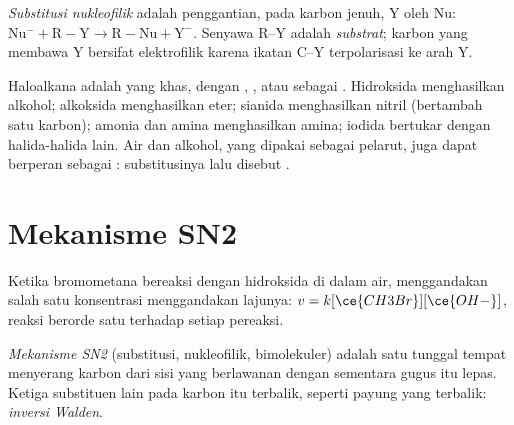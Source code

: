 \begin{definition}\label{def:b1:nucleophilic-substitution:substitution}
\emph{Substitusi nukleofilik} adalah
penggantian, pada karbon jenuh,  Y oleh  Nu:
$\mathrm{Nu^-} + \mathrm{R{-}Y} \to \mathrm{R{-}Nu} +
\mathrm{Y^-}$. Senyawa R--Y adalah \emph{substrat};
karbon yang membawa Y bersifat elektrofilik karena ikatan C--Y
terpolarisasi ke arah Y.
\end{definition}

Haloalkana adalah  yang khas, dengan , , atau
 sebagai . Hidroksida menghasilkan alkohol; alkoksida
menghasilkan eter; sianida menghasilkan nitril (bertambah satu karbon);
amonia dan amina menghasilkan amina; iodida bertukar dengan halida-halida
lain. Air dan alkohol, yang dipakai sebagai pelarut, juga dapat berperan
sebagai : substitusinya lalu disebut .

\section{Mekanisme SN2}

Ketika bromometana bereaksi dengan hidroksida di dalam air, menggandakan
salah satu konsentrasi menggandakan lajunya: $v = k[\ce{CH3Br}][\ce{OH-}]$,
reaksi berorde satu terhadap setiap pereaksi.

\begin{definition}\label{def:b1:nucleophilic-substitution:sn2}
\emph{Mekanisme SN2} (substitusi, nukleofilik,
bimolekuler) adalah satu  tunggal tempat 
menyerang karbon dari sisi yang berlawanan dengan  sementara
gugus itu lepas. Ketiga substituen lain pada karbon itu terbalik,
seperti payung yang terbalik:
\emph{inversi Walden}.
\end{definition}

